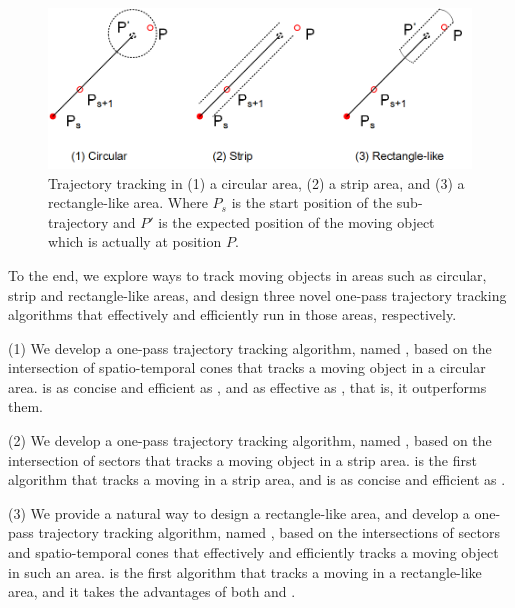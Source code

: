 \begin{figure}[tb!]
	\centering
	\includegraphics[scale=1.0]{Figures/Fig-Areas.png}\vspace{-1ex}
	\caption{\small  Trajectory tracking in (1) a circular area, (2) a strip area, and (3) a rectangle-like area. Where $P_s$ is the start position of the sub-trajectory and $P'$ is the expected position of the moving object which is actually at position $P$.}
	\vspace{-2ex}
	\label{fig:areas}
\end{figure}

To the end, we explore ways to track moving objects in areas such as circular, strip and rectangle-like areas, and design three novel one-pass trajectory tracking algorithms that effectively and efficiently run in those areas, respectively. 

\ni (1) We develop a one-pass trajectory tracking algorithm, named \citt, based on the intersection of spatio-temporal cones that tracks a moving object in a circular area. \citt is as concise and efficient as \ldrh, and as effective as \grts, that is, it outperforms them.

\ni (2) We develop a one-pass trajectory tracking algorithm, named \sitt, based on the intersection of sectors that tracks a moving object in a strip area. \sitt is the first algorithm that tracks a moving in a strip area, and is as concise and efficient as \citt. %

\ni (3) We provide a natural way to design a rectangle-like area, and develop a one-pass trajectory tracking algorithm, named \bitt, based on the intersections of sectors and spatio-temporal cones that  effectively and efficiently tracks a moving object in such an area. \bitt is the first algorithm that tracks a moving in a rectangle-like area, and it takes the advantages of both \citt and \sitt. 

